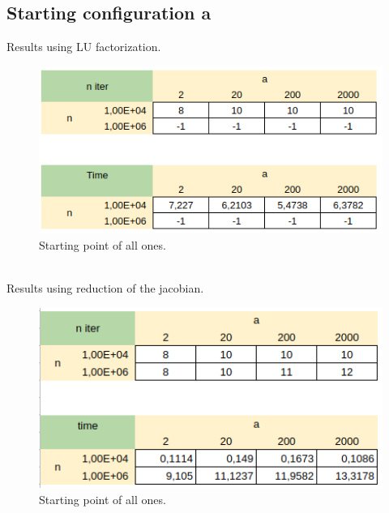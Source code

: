 \documentclass[]{article}
\begin{document}
\subsection{Starting configuration a}
Results using LU factorization.\\
\begin{figure}[h]
	\includegraphics[width=12cm]{table5.png}
	\caption{Starting point of all ones.}
\end{figure}\\
Results using reduction of the jacobian.
\begin{figure}[h]
	\includegraphics[width=12cm]{table2.png}
	\caption{Starting point of all ones.}
\end{figure}
\pagebreak
\end{document}
